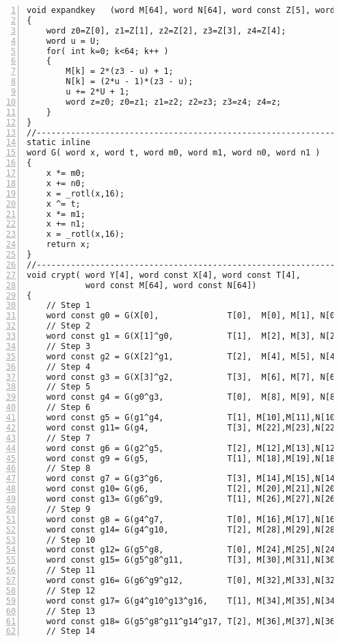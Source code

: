 \documentclass[a4paper,oneside,english]{amsart}
\numberwithin{equation}{section}
\numberwithin{figure}{section}
\begin{document}

{\footnotesize }
\begin{lstlisting}[basicstyle={\scriptsize\ttfamily},numbers=left,tabsize=4]
void expandkey   (word M[64], word N[64], word const Z[5], word U)
{
    word z0=Z[0], z1=Z[1], z2=Z[2], z3=Z[3], z4=Z[4];
    word u = U;
    for( int k=0; k<64; k++ )
    {
        M[k] = 2*(z3 - u) + 1;
        N[k] = (2*u - 1)*(z3 - u);
        u += 2*U + 1;
        word z=z0; z0=z1; z1=z2; z2=z3; z3=z4; z4=z;
    }
}
//----------------------------------------------------------------------
static inline 
word G( word x, word t, word m0, word m1, word n0, word n1 )
{
    x *= m0;
    x += n0;
    x = _rotl(x,16);
    x ^= t;
    x *= m1;
    x += n1;
    x = _rotl(x,16);
    return x;
}
//----------------------------------------------------------------------
void crypt( word Y[4], word const X[4], word const T[4], 
            word const M[64], word const N[64])
{   
    // Step 1
    word const g0 = G(X[0],              T[0],  M[0], M[1], N[0], N[1]);
    // Step 2
    word const g1 = G(X[1]^g0,           T[1],  M[2], M[3], N[2], N[3]);
    // Step 3
    word const g2 = G(X[2]^g1,           T[2],  M[4], M[5], N[4], N[5]);
    // Step 4
    word const g3 = G(X[3]^g2,           T[3],  M[6], M[7], N[6], N[7]);
    // Step 5
    word const g4 = G(g0^g3,             T[0],  M[8], M[9], N[8], N[9]);
    // Step 6
    word const g5 = G(g1^g4,             T[1], M[10],M[11],N[10],N[11]);
    word const g11= G(g4,                T[3], M[22],M[23],N[22],N[23]);
    // Step 7
    word const g6 = G(g2^g5,             T[2], M[12],M[13],N[12],N[13]);
    word const g9 = G(g5,                T[1], M[18],M[19],N[18],N[19]);
    // Step 8
    word const g7 = G(g3^g6,             T[3], M[14],M[15],N[14],N[15]);
    word const g10= G(g6,                T[2], M[20],M[21],N[20],N[21]);
    word const g13= G(g6^g9,             T[1], M[26],M[27],N[26],N[27]);
    // Step 9
    word const g8 = G(g4^g7,             T[0], M[16],M[17],N[16],N[17]);
    word const g14= G(g4^g10,            T[2], M[28],M[29],N[28],N[29]);
    // Step 10
    word const g12= G(g5^g8,             T[0], M[24],M[25],N[24],N[25]);
    word const g15= G(g5^g8^g11,         T[3], M[30],M[31],N[30],N[31]);
    // Step 11
    word const g16= G(g6^g9^g12,         T[0], M[32],M[33],N[32],N[33]);
    // Step 12
    word const g17= G(g4^g10^g13^g16,    T[1], M[34],M[35],N[34],N[35]);
    // Step 13
    word const g18= G(g5^g8^g11^g14^g17, T[2], M[36],M[37],N[36],N[37]);
    // Step 14

\end{lstlisting}
\end{document}
